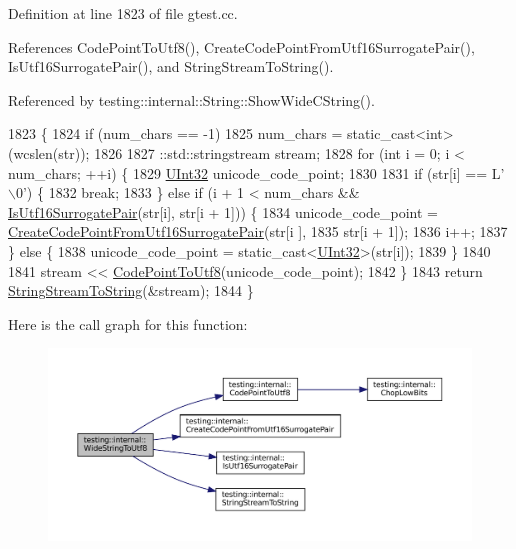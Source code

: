Definition at line 1823 of file gtest.\+cc.



References Code\+Point\+To\+Utf8(), Create\+Code\+Point\+From\+Utf16\+Surrogate\+Pair(), Is\+Utf16\+Surrogate\+Pair(), and String\+Stream\+To\+String().



Referenced by testing\+::internal\+::\+String\+::\+Show\+Wide\+C\+String().


\begin{DoxyCode}
1823                                                               \{
1824   \textcolor{keywordflow}{if} (num\_chars == -1)
1825     num\_chars = \textcolor{keyword}{static\_cast<}\textcolor{keywordtype}{int}\textcolor{keyword}{>}(wcslen(str));
1826 
1827   ::std::stringstream stream;
1828   \textcolor{keywordflow}{for} (\textcolor{keywordtype}{int} i = 0; i < num\_chars; ++i) \{
1829     \hyperlink{namespacetesting_1_1internal_a40d4fffcd2bf56f18b1c380615aa85e3}{UInt32} unicode\_code\_point;
1830 
1831     \textcolor{keywordflow}{if} (str[i] == L\textcolor{charliteral}{'\(\backslash\)0'}) \{
1832       \textcolor{keywordflow}{break};
1833     \} \textcolor{keywordflow}{else} \textcolor{keywordflow}{if} (i + 1 < num\_chars && \hyperlink{namespacetesting_1_1internal_a681895f8cc32286211be9889da107394}{IsUtf16SurrogatePair}(str[i], str[i + 1])) \{
1834       unicode\_code\_point = \hyperlink{namespacetesting_1_1internal_ac8ef1bb10cd9e69de939789b759e6bc9}{CreateCodePointFromUtf16SurrogatePair}(str[i
      ],
1835                                                                  str[i + 1]);
1836       i++;
1837     \} \textcolor{keywordflow}{else} \{
1838       unicode\_code\_point = \textcolor{keyword}{static\_cast<}\hyperlink{namespacetesting_1_1internal_a40d4fffcd2bf56f18b1c380615aa85e3}{UInt32}\textcolor{keyword}{>}(str[i]);
1839     \}
1840 
1841     stream << \hyperlink{namespacetesting_1_1internal_a0c0f9558efb9abb965851c4738cdc725}{CodePointToUtf8}(unicode\_code\_point);
1842   \}
1843   \textcolor{keywordflow}{return} \hyperlink{namespacetesting_1_1internal_ac0a2b7f69fc829d80a39e925b6417e39}{StringStreamToString}(&stream);
1844 \}
\end{DoxyCode}
Here is the call graph for this function\+:
\nopagebreak
\begin{figure}[H]
\begin{center}
\leavevmode
\includegraphics[width=350pt]{namespacetesting_1_1internal_a05b8c86ff38243f34d8f839a0eadefb1_cgraph}
\end{center}
\end{figure}
